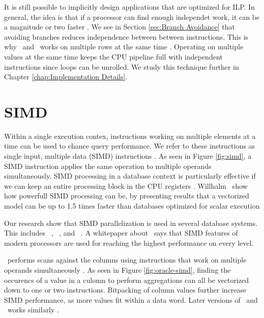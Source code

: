 It is still possible to implicitly design applications that are optimized for ILP. In general, the idea is that if a processor can find enough independet work, it can be a magnitude or two faster \cite{Boncz2005-wj}. We see in Section \ref{sec:Branch Avoidance} that avoiding branches reduces independence between between instructions. This is why \monetx~and \blink~works on multiple rows at the same time \cite{Boncz2005-wj, Johnson2008-cp}. Operating on multiple values at the same time keeps the CPU pipeline full with independent instructions since loops can be unrolled. We study this technique further in Chapter \ref{chap:Implementation Details}.


\section{SIMD}
\label{sec:SIMD}
Within a single execution contex, instructions working on multiple elements at a time can be used to ehance query performance. We refer to these instructions as single input, multiple data (SIMD) instructions \cite{Wikipedia_contributors2015-ax}. As seen in Figure \ref{fig:simd}, a SIMD instruction applies the same operation to multiple operands simultaneously. SIMD processing in a database context is particularly effective if we can keep an entire processing block in the CPU registers \cite{Neumann2011-uq}. Willhalm \ea~show how powerfull SIMD processing can be, by presenting results that a vectorized model can be up to 1.5 times faster than databases optimized for scalar execution \cite{Willhalm2009-hu}

Our research show that SIMD parallelization is used in several database systems. This includes \oracle~\cite{Lahiri2015-mz}, \blink~\cite{Barber2012-xt}, and \ibm~\cite{Raman2013-em}. A whitepaper about \exasol~says that SIMD features of modern processors are used for reaching the highest performance on every level.

\oracle~performs scans against the columns using instructions that work on multiple operands simultaneously \cite{Lahiri2015-mz}. As seen in Figure \ref{fig:oracle-simd}, finding the occurencs of a value in a culomn to perform aggregations can all be vectorized down to one or two instructions. Bitpacking of column values further increase SIMD performance, as more values fit within a data word. Later versions of \blink~and \ibm~works similarly \cite{Barber2012-xt, Raman2013-em}.

